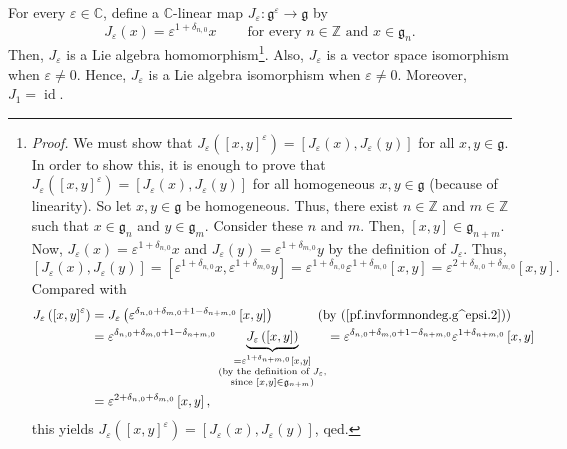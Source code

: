 \documentclass
[numbers=enddot,12pt,final,onecolumn,german,notitlepage]{scrartcl}%
\theoremstyle{definition}
\begin{document}
For every $\varepsilon\in\mathbb{C}$, define a $\mathbb{C}$-linear map
$J_{\varepsilon}:\mathfrak{g}^{\varepsilon}\rightarrow\mathfrak{g}$ by%
\[
J_{\varepsilon}\left(  x\right)  =\varepsilon^{1+\delta_{n,0}}%
x\ \ \ \ \ \ \ \ \ \ \text{for every }n\in\mathbb{Z}\text{ and }%
x\in\mathfrak{g}_{n}.
\]
Then, $J_{\varepsilon}$ is a Lie algebra homomorphism\footnote{\textit{Proof.}
We must show that $J_{\varepsilon}\left(  \left[  x,y\right]  ^{\varepsilon
}\right)  =\left[  J_{\varepsilon}\left(  x\right)  ,J_{\varepsilon}\left(
y\right)  \right]  $ for all $x,y\in\mathfrak{g}$. In order to show this, it
is enough to prove that $J_{\varepsilon}\left(  \left[  x,y\right]
^{\varepsilon}\right)  =\left[  J_{\varepsilon}\left(  x\right)
,J_{\varepsilon}\left(  y\right)  \right]  $ for all homogeneous
$x,y\in\mathfrak{g}$ (because of linearity). So let $x,y\in\mathfrak{g}$ be
homogeneous. Thus, there exist $n\in\mathbb{Z}$ and $m\in\mathbb{Z}$ such that
$x\in\mathfrak{g}_{n}$ and $y\in\mathfrak{g}_{m}$. Consider these $n$ and $m$.
Then, $\left[  x,y\right]  \in\mathfrak{g}_{n+m}$. Now, $J_{\varepsilon
}\left(  x\right)  =\varepsilon^{1+\delta_{n,0}}x$ and $J_{\varepsilon}\left(
y\right)  =\varepsilon^{1+\delta_{m,0}}y$ by the definition of $J_{\varepsilon
}$. Thus,%
\[
\left[  J_{\varepsilon}\left(  x\right)  ,J_{\varepsilon}\left(  y\right)
\right]  =\left[  \varepsilon^{1+\delta_{n,0}}x,\varepsilon^{1+\delta_{m,0}%
}y\right]  =\varepsilon^{1+\delta_{n,0}}\varepsilon^{1+\delta_{m,0}}\left[
x,y\right]  =\varepsilon^{2+\delta_{n,0}+\delta_{m,0}}\left[  x,y\right]  .
\]
Compared with%
\begin{align*}
J_{\varepsilon}\left(  \left[  x,y\right]  ^{\varepsilon}\right)   &
=J_{\varepsilon}\left(  \varepsilon^{\delta_{n,0}+\delta_{m,0}+1-\delta
_{n+m,0}}\left[  x,y\right]  \right)  \ \ \ \ \ \ \ \ \ \ \left(  \text{by
(\ref{pf.invformnondeg.g^epsi.2})}\right) \\
&  =\varepsilon^{\delta_{n,0}+\delta_{m,0}+1-\delta_{n+m,0}}%
\underbrace{J_{\varepsilon}\left(  \left[  x,y\right]  \right)  }%
_{\substack{=\varepsilon^{1+\delta_{n+m,0}}\left[  x,y\right]  \\\text{(by the
definition of }J_{\varepsilon}\text{,}\\\text{since }\left[  x,y\right]
\in\mathfrak{g}_{n+m}\text{)}}}=\varepsilon^{\delta_{n,0}+\delta
_{m,0}+1-\delta_{n+m,0}}\varepsilon^{1+\delta_{n+m,0}}\left[  x,y\right] \\
&  =\varepsilon^{2+\delta_{n,0}+\delta_{m,0}}\left[  x,y\right]  ,
\end{align*}
this yields $J_{\varepsilon}\left(  \left[  x,y\right]  ^{\varepsilon}\right)
=\left[  J_{\varepsilon}\left(  x\right)  ,J_{\varepsilon}\left(  y\right)
\right]  $, qed.}. Also, $J_{\varepsilon}$ is a vector space isomorphism when
$\varepsilon\neq0$. Hence, $J_{\varepsilon}$ is a Lie algebra isomorphism when
$\varepsilon\neq0$. Moreover, $J_{1}=\operatorname*{id}$.
\end{document}
